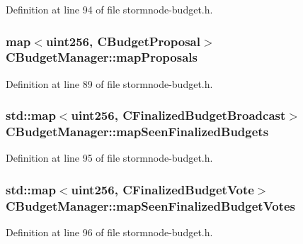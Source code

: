 Definition at line 94 of file stormnode-\/budget.\+h.

\hypertarget{class_c_budget_manager_a25d2d0ede6489ea2069e1089dae39f49}{}
\subsubsection[{map\+Proposals}]{\setlength{\rightskip}{0pt plus 5cm}map$<${\bf uint256}, {\bf C\+Budget\+Proposal}$>$ C\+Budget\+Manager\+::map\+Proposals}\label{class_c_budget_manager_a25d2d0ede6489ea2069e1089dae39f49}


Definition at line 89 of file stormnode-\/budget.\+h.

\hypertarget{class_c_budget_manager_a289e14968fc776b8c0570b03ea8c8ecd}{}
\subsubsection[{map\+Seen\+Finalized\+Budgets}]{\setlength{\rightskip}{0pt plus 5cm}std\+::map$<${\bf uint256}, {\bf C\+Finalized\+Budget\+Broadcast}$>$ C\+Budget\+Manager\+::map\+Seen\+Finalized\+Budgets}\label{class_c_budget_manager_a289e14968fc776b8c0570b03ea8c8ecd}


Definition at line 95 of file stormnode-\/budget.\+h.

\hypertarget{class_c_budget_manager_aecbf6ad23e6f6044672d5619d3e7c40d}{}
\subsubsection[{map\+Seen\+Finalized\+Budget\+Votes}]{\setlength{\rightskip}{0pt plus 5cm}std\+::map$<${\bf uint256}, {\bf C\+Finalized\+Budget\+Vote}$>$ C\+Budget\+Manager\+::map\+Seen\+Finalized\+Budget\+Votes}\label{class_c_budget_manager_aecbf6ad23e6f6044672d5619d3e7c40d}


Definition at line 96 of file stormnode-\/budget.\+h.

\hypertarget{class_c_budget_manager_a5336c99bc4c72c185de0391165a67159}{}
